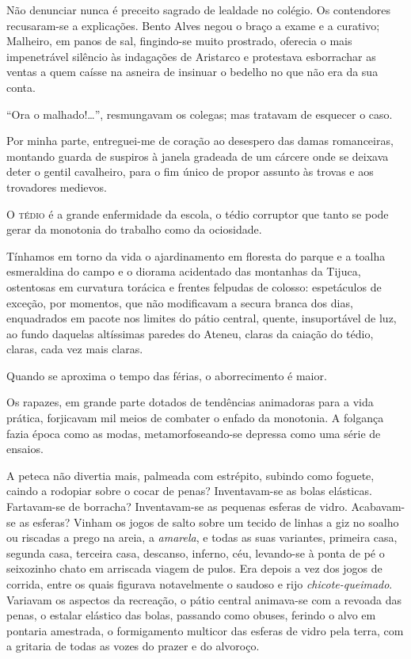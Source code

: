 Não denunciar nunca é preceito
sagrado de lealdade no colégio. Os contendores recusaram{}-se a
explicações. Bento Alves negou o braço a exame e a curativo; Malheiro,
em panos de sal, fingindo{}-se muito prostrado, oferecia o mais
impenetrável silêncio às indagações de Aristarco e protestava
esborrachar as ventas a quem caísse na asneira de insinuar o bedelho no
que não era da sua conta. 

``Ora o malhado!\ldots'', resmungavam os colegas;
mas tratavam de esquecer o caso. 

Por minha parte, entreguei{}-me de
coração ao desespero das damas romanceiras, montando guarda de suspiros
à janela gradeada de um cárcere onde se deixava deter o gentil
cavalheiro, para o fim único de propor assunto às trovas e aos
trovadores medievos.

\sectionitem
\noindent\textsc{O tédio} é a grande enfermidade da escola, o tédio corruptor que tanto se
pode gerar da monotonia do trabalho como da ociosidade. 

Tínhamos em
torno da vida o ajardinamento em floresta do parque e a toalha
esmeraldina do campo e o diorama acidentado das montanhas da Tijuca,
ostentosas em curvatura torácica e frentes felpudas de colosso:
espetáculos de exceção, por momentos, que não modificavam a secura
branca dos dias, enquadrados em pacote nos limites do pátio central,
quente, insuportável de luz, ao fundo daquelas altíssimas paredes do
Ateneu, claras da caiação do tédio, claras, cada vez mais claras.

Quando se aproxima o tempo das férias, o aborrecimento é maior.


Os rapazes, em grande parte dotados de tendências animadoras para a vida
prática, forjicavam mil meios de combater o enfado da monotonia. A
folgança fazia época como as modas, metamorfoseando{}-se depressa como
uma série de ensaios. 

A peteca não divertia mais, palmeada com
estrépito, subindo como foguete, caindo a rodopiar sobre o cocar de
penas? Inventavam{}-se as bolas elásticas. Fartavam{}-se de borracha?
Inventavam{}-se as pequenas esferas de vidro. Acabavam{}-se as esferas?
Vinham os jogos de salto sobre um tecido de linhas a giz no soalho ou
riscadas a prego na areia, a \textit{amarela}, e todas as suas variantes,
primeira casa, segunda casa, terceira casa, descanso, inferno, céu,
levando{}-se à ponta de pé o seixozinho chato em arriscada viagem de
pulos. Era depois a vez dos jogos de corrida, entre os quais figurava
notavelmente o saudoso e rijo \textit{chicote{}-queimado}. Variavam os aspectos
da recreação, o pátio central animava{}-se com a revoada das penas, o
estalar elástico das bolas, passando como obuses, ferindo o alvo em
pontaria amestrada, o formigamento multicor das esferas de vidro pela
terra, com a gritaria de todas as vozes do prazer e do alvoroço. 

